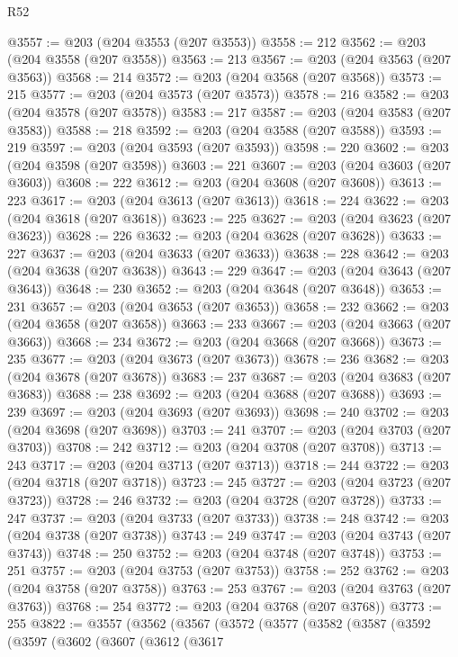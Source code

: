 \begin{lexlean}{R52}
\begin{coremodule}
@3557 := @203 (@204 @3553 (@207 @3553))
@3558 := 212
@3562 := @203 (@204 @3558 (@207 @3558))
@3563 := 213
@3567 := @203 (@204 @3563 (@207 @3563))
@3568 := 214
@3572 := @203 (@204 @3568 (@207 @3568))
@3573 := 215
@3577 := @203 (@204 @3573 (@207 @3573))
@3578 := 216
@3582 := @203 (@204 @3578 (@207 @3578))
@3583 := 217
@3587 := @203 (@204 @3583 (@207 @3583))
@3588 := 218
@3592 := @203 (@204 @3588 (@207 @3588))
@3593 := 219
@3597 := @203 (@204 @3593 (@207 @3593))
@3598 := 220
@3602 := @203 (@204 @3598 (@207 @3598))
@3603 := 221
@3607 := @203 (@204 @3603 (@207 @3603))
@3608 := 222
@3612 := @203 (@204 @3608 (@207 @3608))
@3613 := 223
@3617 := @203 (@204 @3613 (@207 @3613))
@3618 := 224
@3622 := @203 (@204 @3618 (@207 @3618))
@3623 := 225
@3627 := @203 (@204 @3623 (@207 @3623))
@3628 := 226
@3632 := @203 (@204 @3628 (@207 @3628))
@3633 := 227
@3637 := @203 (@204 @3633 (@207 @3633))
@3638 := 228
@3642 := @203 (@204 @3638 (@207 @3638))
@3643 := 229
@3647 := @203 (@204 @3643 (@207 @3643))
@3648 := 230
@3652 := @203 (@204 @3648 (@207 @3648))
@3653 := 231
@3657 := @203 (@204 @3653 (@207 @3653))
@3658 := 232
@3662 := @203 (@204 @3658 (@207 @3658))
@3663 := 233
@3667 := @203 (@204 @3663 (@207 @3663))
@3668 := 234
@3672 := @203 (@204 @3668 (@207 @3668))
@3673 := 235
@3677 := @203 (@204 @3673 (@207 @3673))
@3678 := 236
@3682 := @203 (@204 @3678 (@207 @3678))
@3683 := 237
@3687 := @203 (@204 @3683 (@207 @3683))
@3688 := 238
@3692 := @203 (@204 @3688 (@207 @3688))
@3693 := 239
@3697 := @203 (@204 @3693 (@207 @3693))
@3698 := 240
@3702 := @203 (@204 @3698 (@207 @3698))
@3703 := 241
@3707 := @203 (@204 @3703 (@207 @3703))
@3708 := 242
@3712 := @203 (@204 @3708 (@207 @3708))
@3713 := 243
@3717 := @203 (@204 @3713 (@207 @3713))
@3718 := 244
@3722 := @203 (@204 @3718 (@207 @3718))
@3723 := 245
@3727 := @203 (@204 @3723 (@207 @3723))
@3728 := 246
@3732 := @203 (@204 @3728 (@207 @3728))
@3733 := 247
@3737 := @203 (@204 @3733 (@207 @3733))
@3738 := 248
@3742 := @203 (@204 @3738 (@207 @3738))
@3743 := 249
@3747 := @203 (@204 @3743 (@207 @3743))
@3748 := 250
@3752 := @203 (@204 @3748 (@207 @3748))
@3753 := 251
@3757 := @203 (@204 @3753 (@207 @3753))
@3758 := 252
@3762 := @203 (@204 @3758 (@207 @3758))
@3763 := 253
@3767 := @203 (@204 @3763 (@207 @3763))
@3768 := 254
@3772 := @203 (@204 @3768 (@207 @3768))
@3773 := 255
@3822 := @3557
    (@3562
      (@3567
        (@3572
          (@3577
            (@3582
              (@3587
                (@3592
                  (@3597
                    (@3602
                      (@3607
                        (@3612
                          (@3617

\end{coremodule}
\end{lexlean}
